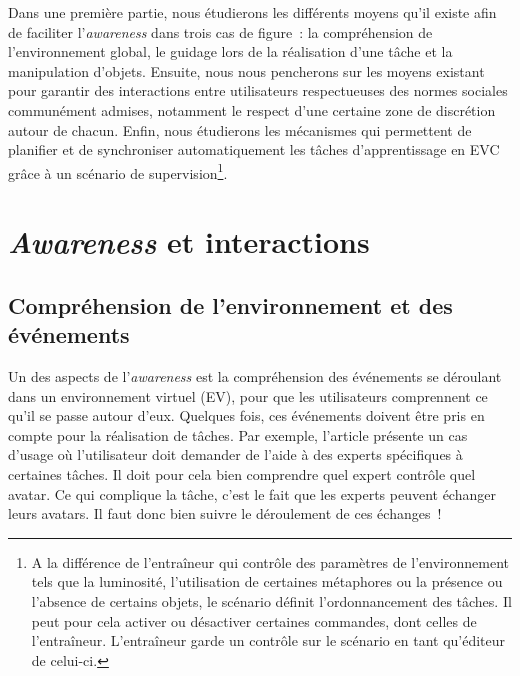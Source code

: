 \documentclass[11pt]{article}
\begin{document}
Dans une première partie, nous étudierons les différents moyens qu'il existe afin de faciliter l'\textit{awareness} dans trois cas de figure~: la compréhension de l'environnement global, le guidage lors de la réalisation d'une tâche et la manipulation d'objets. Ensuite, nous nous pencherons sur les moyens existant pour garantir des interactions entre utilisateurs respectueuses des normes sociales communément admises, notamment le respect d'une certaine zone de discrétion autour de chacun. Enfin, nous étudierons les mécanismes qui permettent de planifier et de synchroniser automatiquement les tâches d'apprentissage en EVC grâce à un scénario de supervision\footnote{A la différence de l'entraîneur qui contrôle des paramètres de l'environnement tels que la luminosité, l'utilisation de certaines métaphores ou la présence ou l'absence de certains objets, le scénario définit l'ordonnancement des tâches. Il peut pour cela activer ou désactiver certaines commandes, dont celles de l'entraîneur. L'entraîneur garde un contrôle sur le scénario en tant qu'éditeur de celui-ci.}.

\section{\textit{Awareness} et interactions}

\subsection{Compréhension de l'environnement et des événements}
Un des aspects de l'\textit{awareness} est la compréhension des événements se déroulant dans un environnement virtuel (EV), pour que les utilisateurs comprennent ce qu'il se passe autour d'eux. Quelques fois, ces événements doivent être pris en compte pour la réalisation de tâches. Par exemple, l'article \cite{avatars} présente un cas d'usage où l'utilisateur doit demander de l'aide à des experts spécifiques à certaines tâches. Il doit pour cela bien comprendre quel expert contrôle quel avatar. Ce qui complique la tâche, c'est le fait que les experts peuvent échanger leurs avatars. Il faut donc bien suivre le déroulement de ces échanges~!
\\
\end{document}
